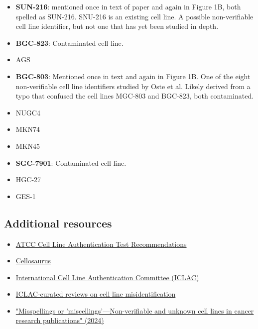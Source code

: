 \documentclass[letterpaper, 12pt]{article}
\begin{document}
\begin{itemize}
    \setlength\itemsep{-0.5em}
    \item \textbf{SUN-216}: mentioned once in text of paper and again in Figure 1B, both spelled as SUN-216. SNU-216 is an existing cell line. A possible non-verifiable cell line identifier, but not one that has yet been studied in depth.
    \item \textbf{BGC-823}: Contaminated cell line.
    \item AGS
    \item \textbf{BGC-803}: Mentioned once in text and again in Figure 1B. One of the eight non-verifiable cell line identifiers studied by Oste et al. Likely derived from a typo that confused the cell lines MGC-803 and BGC-823, both contaminated.
    \item NUGC4
    \item MKN74
    \item MKN45
    \item \textbf{SGC-7901}: Contaminated cell line.
    \item HGC-27
    \item GES-1
\end{itemize}

\subsection*{Additional resources}

\begin{itemize}
    \setlength\itemsep{-0.5em}
    \item \href{https://www.atcc.org/resources/technical-documents/cell-line-authentication-test-recommendations}{ATCC Cell Line Authentication Test Recommendations}
    \item \href{https://www.cellosaurus.org/index.html}{Cellosaurus}
    \item \href{https://iclac.org/}{International Cell Line Authentication Committee (ICLAC)}
    \item \href{https://iclac.org/references/reading-reviews/}{ICLAC-curated reviews on cell line misidentification}
    \item \href{https://doi.org/10.1002/ijc.34995}{"Misspellings or 'miscellings'—Non-verifiable and unknown cell lines in cancer research publications" (2024)}

\end{itemize}
\end{document}
